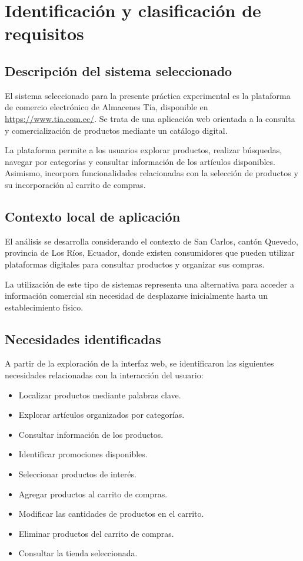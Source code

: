 
\section{Identificación y clasificación de requisitos}

\subsection{Descripción del sistema seleccionado}

El sistema seleccionado para la presente práctica experimental
es la plataforma de comercio electrónico de Almacenes Tía,
disponible en \url{https://www.tia.com.ec/}. Se trata de una
aplicación web orientada a la consulta y comercialización
de productos mediante un catálogo digital.

La plataforma permite a los usuarios explorar productos,
realizar búsquedas, navegar por categorías y consultar
información de los artículos disponibles. Asimismo,
incorpora funcionalidades relacionadas con la selección
de productos y su incorporación al carrito de compras.

\subsection{Contexto local de aplicación}

El análisis se desarrolla considerando el contexto de
San Carlos, cantón Quevedo, provincia de Los Ríos,
Ecuador, donde existen consumidores que pueden utilizar
plataformas digitales para consultar productos y
organizar sus compras.

La utilización de este tipo de sistemas representa una
alternativa para acceder a información comercial sin
necesidad de desplazarse inicialmente hasta un
establecimiento físico.

\subsection{Necesidades identificadas}

A partir de la exploración de la interfaz web,
se identificaron las siguientes necesidades
relacionadas con la interacción del usuario:

\begin{itemize}
    \item Localizar productos mediante palabras clave.
    \item Explorar artículos organizados por categorías.
    \item Consultar información de los productos.
    \item Identificar promociones disponibles.
    \item Seleccionar productos de interés.
    \item Agregar productos al carrito de compras.
    \item Modificar las cantidades de productos en el carrito.
    \item Eliminar productos del carrito de compras.
    \item Consultar la tienda seleccionada.
\end{itemize}

